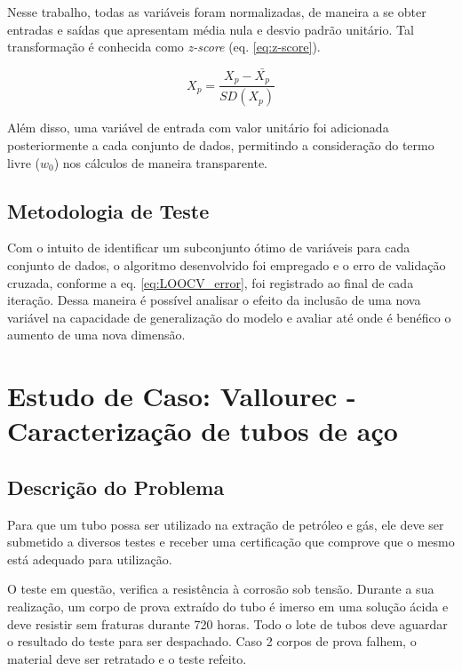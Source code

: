 Nesse trabalho, todas as variáveis foram normalizadas, de maneira a se obter entradas e saídas que apresentam média nula e desvio padrão unitário. Tal transformação é conhecida como \textit{z-score} (eq. \ref{eq:z-score}).

\begin{equation}
    X_p = \frac{ X_p - \bar{X_p} }{SD(X_p)}
    \label{eq:z-score}
\end{equation}

Além disso, uma variável de entrada com valor unitário foi adicionada posteriormente a cada conjunto de dados, permitindo a consideração do termo livre ($w_0$) nos cálculos de maneira transparente.

\subsection{Metodologia de Teste}

Com o intuito de identificar um subconjunto ótimo de variáveis para cada conjunto de dados, o algoritmo 
desenvolvido foi empregado e o erro de validação cruzada, conforme a eq. \ref{eq:LOOCV_error}, foi registrado ao final de cada iteração. Dessa maneira é possível analisar o efeito da inclusão de uma nova variável na capacidade de generalização do modelo e avaliar até onde é benéfico o aumento de uma nova dimensão.

\section{Estudo de Caso: Vallourec - Caracterização de tubos de aço}

\subsection{Descrição do Problema}

Para que um tubo possa ser utilizado na extração de petróleo e gás, ele deve ser submetido a diversos testes e receber uma certificação que comprove que o mesmo está adequado para utilização.

O teste em questão, verifica a resistência à corrosão sob tensão. Durante a sua realização, um corpo de prova extraído do tubo é imerso em uma solução ácida e deve resistir sem fraturas durante 720 horas. Todo o lote de tubos deve aguardar o resultado do teste para ser despachado. Caso 2 corpos de prova falhem, o material deve ser retratado e o teste refeito. 

